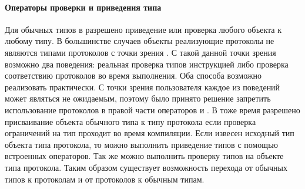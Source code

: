 \paragraph{Операторы проверки и приведения типа}
Для обычных типов в  разрешено приведение или проверка любого объекта к любому типу. В большинстве случаев объекты реализующие протоколы не являются типами протоколов с точки зрения . С такой данной точки зрения возможно два поведения: реальная проверка типов инструкцией  либо проверка соответствию протоколов во время выполнения. Оба способа возможно реализовать практически. С точки зрения пользователя каждое из поведений может являться не ожидаемым, поэтому было принято решение запретить использование протоколов в правой части операторов  и . В тоже время разрешено присваивание объекта обычного типа к типу протокола если проверка ограничений на тип проходит во время компиляции. Если извесен исходный тип объекта типа протокола, то можно выполнить приведение типов с помощью встроенных операторов. Так же можно выполнить проверку типов на объекте типа протокола. Таким образом существует возможность перехода от обычных типов к протоколам и от протоколов к обычным типам.
